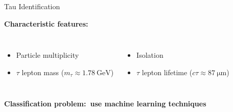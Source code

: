 \documentclass[11pt, xcolor={dvipsnames}, aspectratio=169, notes]{beamer}
\begin{document}
\begin{frame}{Tau Identification}
  \vspace*{0.5em}

  \textbf{Characteristic features:}%

  \begin{columns}[onlytextwidth]

    \begin{itemize}
    \item Particle multiplicity
    \item $\tau$ lepton mass ($m_\tau \approx \SI{1.78}{\GeV}$)
    \end{itemize}


    \begin{itemize}
    \item Isolation
    \item $\tau$ lepton lifetime ($c\tau \approx \SI{87}{\micro\meter}$)
    \end{itemize}
  \end{columns}

  \vspace*{1.25em}

  \textbf{\ra Classification problem:\ use machine learning techniques}



\end{frame}

\end{document}
